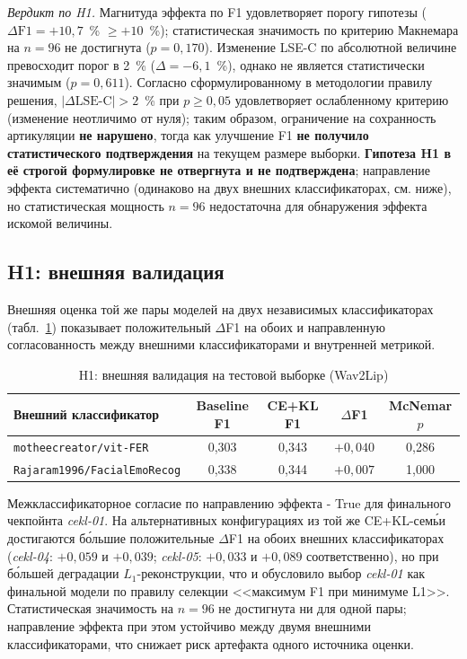 \documentclass[a4paper, 12pt, oneside, openany]{article}
\begin{document}
\textit{Вердикт по H1.} Магнитуда эффекта по F1 удовлетворяет порогу гипотезы ($\Delta\text{F1} = +10{,}7$~\% $\geq +10$~\%); статистическая значимость по критерию Макнемара на $n=96$ не достигнута ($p = 0{,}170$). Изменение LSE-C по абсолютной величине превосходит порог в 2~\% ($\Delta = -6{,}1$~\%), однако не является статистически значимым ($p = 0{,}611$). Согласно сформулированному в методологии правилу решения, $|\Delta\text{LSE-C}|>2$~\% при $p \geq 0{,}05$ удовлетворяет ослабленному критерию (изменение неотличимо от нуля); таким образом, ограничение на сохранность артикуляции \textbf{не нарушено}, тогда как улучшение F1 \textbf{не получило статистического подтверждения} на текущем размере выборки. \textbf{Гипотеза H1 в её строгой формулировке не отвергнута и не подтверждена}; направление эффекта систематично (одинаково на двух внешних классификаторах, см. ниже), но статистическая мощность $n=96$ недостаточна для обнаружения эффекта искомой величины.

\subsection{H1: внешняя валидация}

Внешняя оценка той же пары моделей на двух независимых классификаторах (табл.~\ref{tab:h1_external}) показывает положительный $\Delta$F1 на обоих и направленную согласованность между внешними классификаторами и внутренней метрикой.

\begin{table}[H]
\caption{H1: внешняя валидация на тестовой выборке (Wav2Lip)}
\label{tab:h1_external}
\centering
\small
\begin{tabular}{|p{3.5cm}|c|c|c|c|}
\hline
\textbf{Внешний классификатор} & \textbf{Baseline F1} & \textbf{CE+KL F1} & $\Delta$F1 & McNemar $p$ \\
\hline
\texttt{motheecreator/vit-FER} & 0,303 & 0,343 & $+0,040$ & 0,286 \\
\hline
\texttt{Rajaram1996/FacialEmoRecog} & 0,338 & 0,344 & $+0,007$ & 1,000 \\
\hline
\end{tabular}
\end{table}

Межклассификаторное согласие по направлению эффекта - True для финального чекпойнта \textit{cekl-01}. На альтернативных конфигурациях из той же CE+KL-сем\'ьи достигаются б\'ольшие положительные $\Delta$F1 на обоих внешних классификаторах (\textit{cekl-04}: $+0{,}059$ и $+0{,}039$; \textit{cekl-05}: $+0{,}033$ и $+0{,}089$ соответственно), но при б\'ольшей деградации $L_1$-реконструкции, что и обусловило выбор \textit{cekl-01} как финальной модели по правилу селекции <<максимум F1 при минимуме L1>>. Статистическая значимость на $n=96$ не достигнута ни для одной пары; направление эффекта при этом устойчиво между двумя внешними классификаторами, что снижает риск артефакта одного источника оценки.
\end{document}
